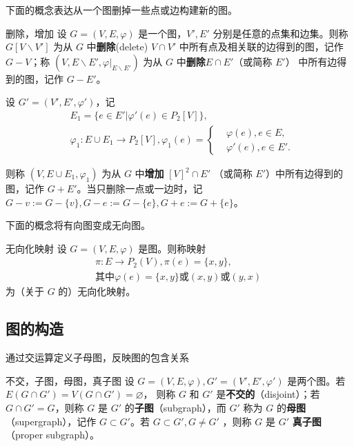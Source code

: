 下面的概念表达从一个图删掉一些点或边构建新的图。
\begin{definition}{删除，增加}
设 $G=(V,E,\varphi)$ 是一个图，$V',E'$ 分别是任意的点集和边集。则称 $G[V\backslash V']$ 为从 $G$ 中\textbf{删除}(delete) $V\cap V'$ 中所有点及相关联的边得到的图，记作 $G-V$；称
 $(V,E\backslash E',\varphi|_{E\backslash E'})$ 为从 $G$ 中\textbf{删除}$E\cap E'$（或简称 $E'$） 中所有边得到的图，记作 $G-E'$。
 
 设 $G'=(V',E',\varphi')$，记
 \begin{equation}
 \begin{aligned}
  &E_1=\{e\in E'|\varphi'(e)\in P_2[V]\},\\
  &\varphi_1:E\cup E_1\rightarrow P_2[V],\varphi_1(e)=\left\{\begin{aligned}
  &\varphi(e),e\in E,\\
  &\varphi'(e),e\in E'.
  \end{aligned}\right.
 \end{aligned}~
 \end{equation}
 
 则称 $(V,E\cup E_1,\varphi_1)$ 为从 $G$ 中\textbf{增加} $[V]^2\cap E'$ （或简称 $E'$）中所有边得到的图，记作 $G+E'$。当只删除一点或一边时，记 $G-v:=G-\{v\},G-e:=G-\{e\},G+e:=G+\{e\}$。
\end{definition}
下面的概念将有向图变成无向图。
\begin{definition}{无向化映射}
设 $G=(V,E,\varphi)$ 是图。则称映射
\begin{equation}
\begin{aligned}
\pi:E\rightarrow P_2(V),\pi(e)=\{x,y\},\\
\text{其中} \varphi(e)=\{x,y\}\text{或}(x,y)\text{或}(y,x)
\end{aligned}~
\end{equation}
为（关于 $G$ 的）无向化映射。

\end{definition}

\subsection{图的构造}

通过交运算定义子母图，反映图的包含关系

\begin{definition}{不交，子图，母图，真子图}
设 $G=(V,E,\varphi),G'=(V',E',\varphi')$ 是两个图。若 $E(G\cap G')=V(G\cap G')=\varnothing$， 则称 $G$ 和 $G'$ 是\textbf{不交的}（disjoint）；若 $G\cap G'=G$，则称 $G$ 是 $G'$ 的\textbf{子图}（subgraph），而 $G'$ 称为 $G$ 的\textbf{母图}（supergraph），记作 $G\subset G'$。若 $G\subset G', G\neq G'$ ，则称 $G$ 是 $G'$ \textbf{真子图}（proper subgraph）。
\end{definition}

